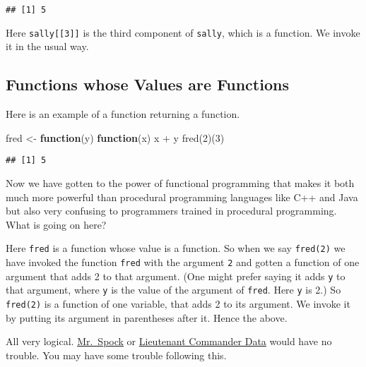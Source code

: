 \documentclass[
]{article}
\newenvironment{Shaded}{\begin{snugshade}}{\end{snugshade}}
\newcommand{\ControlFlowTok}[1]{\textcolor[rgb]{0.13,0.29,0.53}{\textbf{#1}}}
\newcommand{\DecValTok}[1]{\textcolor[rgb]{0.00,0.00,0.81}{#1}}
\newcommand{\FunctionTok}[1]{\textcolor[rgb]{0.00,0.00,0.00}{#1}}
\newcommand{\NormalTok}[1]{#1}
\newcommand{\OtherTok}[1]{\textcolor[rgb]{0.56,0.35,0.01}{#1}}
\newcommand{\SpecialCharTok}[1]{\textcolor[rgb]{0.00,0.00,0.00}{#1}}
\begin{document}
\begin{verbatim}
## [1] 5
\end{verbatim}

Here \texttt{sally{[}{[}3{]}{]}} is the third component of
\texttt{sally}, which is a function. We invoke it in the usual way.

\hypertarget{currying}{%
\subsection{Functions whose Values are Functions}\label{currying}}

Here is an example of a function returning a function.

\begin{Shaded}
\begin{Highlighting}[]
\NormalTok{fred }\OtherTok{\textless{}{-}} \ControlFlowTok{function}\NormalTok{(y) }\ControlFlowTok{function}\NormalTok{(x) x }\SpecialCharTok{+}\NormalTok{ y}
\FunctionTok{fred}\NormalTok{(}\DecValTok{2}\NormalTok{)(}\DecValTok{3}\NormalTok{)}
\end{Highlighting}
\end{Shaded}

\begin{verbatim}
## [1] 5
\end{verbatim}

Now we have gotten to the power of functional programming that makes it
both much more powerful than procedural programming languages like C++
and Java but also very confusing to programmers trained in procedural
programming. What is going on here?

Here \texttt{fred} is a function whose value is a function. So when we
say \texttt{fred(2)} we have invoked the function \texttt{fred} with the
argument \texttt{2} and gotten a function of one argument that adds 2 to
that argument. (One might prefer saying it adds \texttt{y} to that
argument, where \texttt{y} is the value of the argument of
\texttt{fred}. Here \texttt{y} is 2.) So \texttt{fred(2)} is a function
of one variable, that adds 2 to its argument. We invoke it by putting
its argument in parentheses after it. Hence the above.

All very logical. \href{https://en.wikipedia.org/wiki/Spock}{Mr.~Spock}
or \href{https://en.wikipedia.org/wiki/Data_(Star_Trek)}{Lieutenant
Commander Data} would have no trouble. You may have some trouble
following this.
\end{document}
